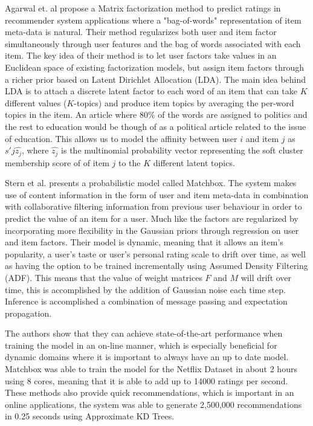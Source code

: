 
Agarwal et. al \cite{Agarwal2010} propose a Matrix factorization method to
predict ratings in recommender system applications where a "bag-of-words"
representation of item meta-data is natural. Their method regularizes both user
and item factor simultaneously through user features and the bag of words
associated with each item. The key idea of their method is to let user factors
take values in an Euclidean space of existing factorization models, but assign
item factors through a richer prior based on Latent Dirichlet Allocation (LDA).
The main idea behind LDA is to attach a discrete latent factor to each word of
an item that can take $K$ different values ($K$-topics) and produce item topics
by averaging the per-word topics in the item. An article where 80$\%$ of the
words are assigned to politics and the rest to education would be though of as
a political article related to the issue of education. This allows us to model
the affinity between user $i$ and item $j$ as $s'{j}\hat{z_{j}}$, where
$\hat{z_{j}}$ is the multinomial probability vector representing the soft
cluster membership score of of item $j$ to the $K$ different latent topics.


Stern et al. \cite{Stern2009} presents a probabilistic model called Matchbox.
The system makes use of content information in the form of user and item
meta-data in combination with collaborative filtering information from previous
user behaviour in order to predict the value of an item for a user. Much like
\cite{Agarwal2009} the factors are regularized by incorporating more
flexibility in the Gaussian priors through regression on user and item factors.
Their model is dynamic, meaning that it allows an item's popularity, a user's
taste or user's personal rating scale to drift over time, as well as having the
option to be trained incrementally using Assumed Density Filtering (ADF). This
means that the value of weight matrices $F$ and $M$ will drift over time, this
is accomplished by the addition of Gaussian noise each time step. Inference is
accomplished a combination of message passing and expectation propagation.

The authors show that they can achieve state-of-the-art performance when
training the model in an on-line manner, which is especially beneficial for
dynamic domains where it is important to always have an up to date model.
Matchbox was able to train the model for the Netflix Dataset in about 2 hours
using 8 cores, meaning that it is able to add up to 14000 ratings per second.
These methods also provide quick recommendations, which is important in an
online applications, the system was able to generate 2,500,000 recommendations
in 0.25 seconds using Approximate KD Trees.

